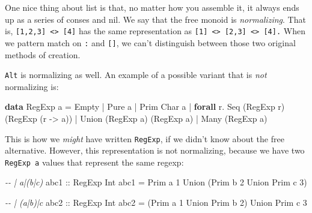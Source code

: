 \documentclass[]{article}
\newenvironment{Shaded}{}{}
\newcommand{\CharTok}[1]{\textcolor[rgb]{0.25,0.44,0.63}{#1}}
\newcommand{\CommentTok}[1]{\textcolor[rgb]{0.38,0.63,0.69}{\textit{#1}}}
\newcommand{\DataTypeTok}[1]{\textcolor[rgb]{0.56,0.13,0.00}{#1}}
\newcommand{\DecValTok}[1]{\textcolor[rgb]{0.25,0.63,0.44}{#1}}
\newcommand{\KeywordTok}[1]{\textcolor[rgb]{0.00,0.44,0.13}{\textbf{#1}}}
\newcommand{\NormalTok}[1]{#1}
\newcommand{\OperatorTok}[1]{\textcolor[rgb]{0.40,0.40,0.40}{#1}}
\newcommand{\OtherTok}[1]{\textcolor[rgb]{0.00,0.44,0.13}{#1}}
\begin{document}
One nice thing about list is that, no matter how you assemble it, it always ends
up as a series of conses and nil. We say that the free monoid is
\emph{normalizing}. That is,
\texttt{{[}1,2,3{]}\ \textless{}\textgreater{}\ {[}4{]}} has the same
representation as
\texttt{{[}1{]}\ \textless{}\textgreater{}\ {[}2,3{]}\ \textless{}\textgreater{}\ {[}4{]}.}
When we pattern match on \texttt{:} and \texttt{{[}{]}}, we can't distinguish
between those two original methods of creation.

\texttt{Alt} is normalizing as well. An example of a possible variant that is
\emph{not} normalizing is:

\begin{Shaded}
\begin{Highlighting}[]
\KeywordTok{data} \DataTypeTok{RegExp}\NormalTok{ a }\OtherTok{=} \DataTypeTok{Empty}
              \OperatorTok{|} \DataTypeTok{Pure}\NormalTok{ a}
              \OperatorTok{|} \DataTypeTok{Prim} \DataTypeTok{Char}\NormalTok{ a}
              \OperatorTok{|} \KeywordTok{forall}\NormalTok{ r}\OperatorTok{.} \DataTypeTok{Seq}\NormalTok{ (}\DataTypeTok{RegExp}\NormalTok{ r) (}\DataTypeTok{RegExp}\NormalTok{ (r }\OtherTok{{-}>}\NormalTok{ a))}
              \OperatorTok{|} \DataTypeTok{Union}\NormalTok{ (}\DataTypeTok{RegExp}\NormalTok{ a) (}\DataTypeTok{RegExp}\NormalTok{ a)}
              \OperatorTok{|} \DataTypeTok{Many}\NormalTok{ (}\DataTypeTok{RegExp}\NormalTok{ a)}
\end{Highlighting}
\end{Shaded}

This is how we \emph{might} have written \texttt{RegExp}, if we didn't know
about the free alternative. However, this representation is not normalizing,
because we have two \texttt{RegExp\ a} values that represent the same regexp:

\begin{Shaded}
\begin{Highlighting}[]
\CommentTok{{-}{-} | a|(b|c)}
\OtherTok{abc1 ::} \DataTypeTok{RegExp} \DataTypeTok{Int}
\NormalTok{abc1 }\OtherTok{=} \DataTypeTok{Prim} \CharTok{\textquotesingle{}a\textquotesingle{}} \DecValTok{1} \OtherTok{\textasciigrave{}Union\textasciigrave{}}\NormalTok{ (}\DataTypeTok{Prim} \CharTok{\textquotesingle{}b\textquotesingle{}} \DecValTok{2} \OtherTok{\textasciigrave{}Union\textasciigrave{}} \DataTypeTok{Prim} \CharTok{\textquotesingle{}c\textquotesingle{}} \DecValTok{3}\NormalTok{)}

\CommentTok{{-}{-} | (a|b)|c}
\OtherTok{abc2 ::} \DataTypeTok{RegExp} \DataTypeTok{Int}
\NormalTok{abc2 }\OtherTok{=}\NormalTok{ (}\DataTypeTok{Prim} \CharTok{\textquotesingle{}a\textquotesingle{}} \DecValTok{1} \OtherTok{\textasciigrave{}Union\textasciigrave{}} \DataTypeTok{Prim} \CharTok{\textquotesingle{}b\textquotesingle{}} \DecValTok{2}\NormalTok{) }\OtherTok{\textasciigrave{}Union\textasciigrave{}} \DataTypeTok{Prim} \CharTok{\textquotesingle{}c\textquotesingle{}} \DecValTok{3}
\end{Highlighting}
\end{Shaded}
\end{document}

